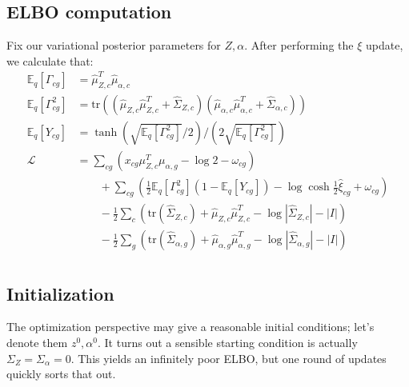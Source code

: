 \documentclass{article}
\begin{document}
\subsection{ELBO computation}

Fix our variational posterior parameters for $Z,\alpha$.  After performing the $\xi$ update, we calculate that:
\begin{align*}
\mathbb{E}_q[\Gamma_{cg}]&=\hat \mu_{Z,c}^T\hat \mu_{\alpha,c} \\
\mathbb{E}_q[\Gamma_{cg}^2]&=\mathrm{tr}\left((\hat \mu_{Z,c}\hat \mu_{Z,c}^T + \hat \Sigma_{Z,c})(\hat \mu_{\alpha,c}\hat \mu_{\alpha,c}^T + \hat \Sigma_{\alpha,c})\right) \\
\mathbb{E}_q[Y_{cg}] &= \tanh\left(\sqrt{\mathbb{E}_q[\Gamma_{cg}^2]}/2\right)/\left(2\sqrt{\mathbb{E}_q[\Gamma_{cg}^2]}\right)\\
\mathcal{L} &= \sum_{cg} \left(x_{cg} \mu_{Z,c}^T\mu_{\alpha,g} - \log 2 - \omega_{cg}\right) \\
&\qquad + \sum_{cg} \left(\frac{1}{2}\mathbb{E}_q[\Gamma_{cg}^2](1-\mathbb{E}_q[Y_{cg}]) - \log\cosh \frac{1}{2} \hat \xi_{cg} + \omega_{cg}\right)\\
&\qquad - \frac{1}{2}\sum_{c} \left(\mathrm{tr}(\hat \Sigma_{Z,c}) + \hat \mu_{Z,c}\hat \mu_{Z,c}^T - \log|\hat \Sigma_{Z,c}| - |I|\right) \\
&\qquad - \frac{1}{2}\sum_{g} \left(\mathrm{tr}(\hat \Sigma_{\alpha,g}) + \hat \mu_{\alpha,g}\hat \mu_{\alpha,g}^T - \log|\hat \Sigma_{\alpha,g}| - |I|\right) \\
\end{align*}

\subsection{Initialization}

The optimization perspective may give a reasonable initial conditions; let's denote them $z^0,\alpha^0$.  It turns out a sensible starting condition is actually $\Sigma_Z=\Sigma_\alpha=0$.  This yields an infinitely poor ELBO, but one round of updates quickly sorts that out.
\end{document}
